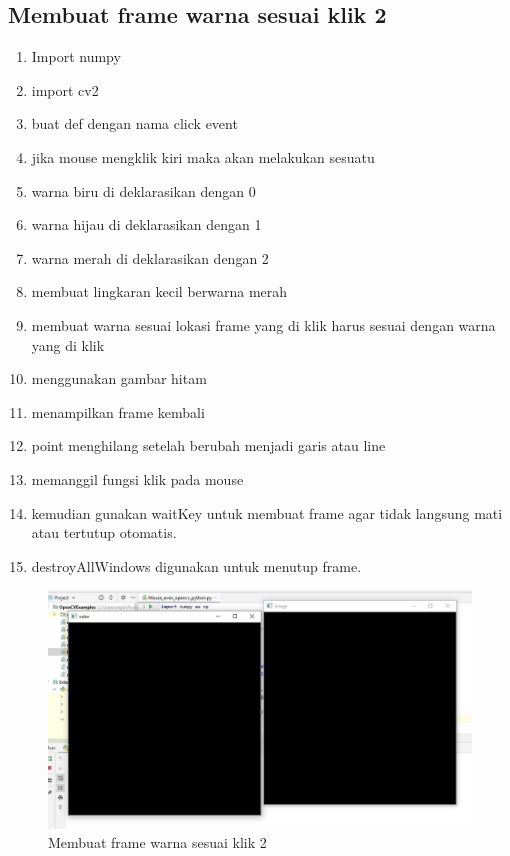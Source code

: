 \subsection{Membuat frame warna sesuai klik 2}

\begin{enumerate}
	\item Import numpy
	\item import cv2
	\item buat def dengan nama click event
	\item jika mouse mengklik kiri maka akan melakukan sesuatu
	\item warna biru di deklarasikan dengan 0
	\item warna hijau di deklarasikan dengan 1
	\item warna merah di deklarasikan dengan 2
	\item membuat lingkaran kecil berwarna merah
	\item membuat warna sesuai lokasi frame yang di klik harus sesuai dengan warna yang di klik
	\item menggunakan gambar hitam
	\item menampilkan frame kembali
	\item point menghilang setelah berubah menjadi garis atau line
	\item memanggil fungsi klik pada mouse
	\item kemudian gunakan waitKey untuk membuat frame agar tidak langsung mati atau tertutup otomatis.
	\item destroyAllWindows digunakan untuk menutup frame.
\end{enumerate}

\begin{figure}[ht]
\centering
\includegraphics[scale=0.4]{figures/2,25.jpg}
\caption{Membuat frame warna sesuai klik 2}
\label{contoh}
\end{figure}



